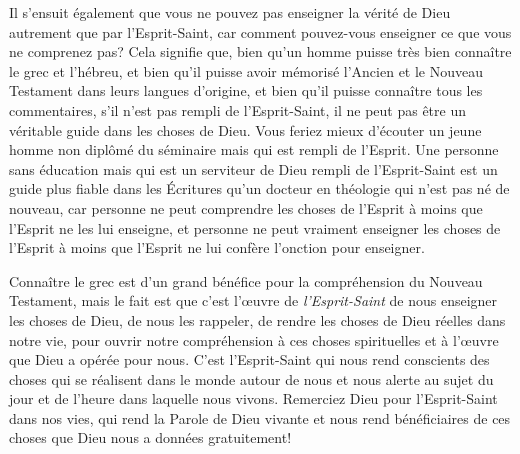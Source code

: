 Il s'ensuit également que vous ne pouvez pas enseigner
 la vérité de Dieu autrement que par l'Esprit-Saint,
 car comment pouvez-vous enseigner ce que vous ne comprenez pas?
 Cela signifie que, bien qu'un homme puisse très bien connaître le grec et l'hébreu,
 et bien qu'il puisse avoir mémorisé l'Ancien
 et le Nouveau Testament dans leurs langues d'origine,
 et bien qu'il puisse connaître tous les commentaires,
 s'il n'est pas rempli de l'Esprit-Saint,
 il ne peut pas être un véritable guide dans les choses de Dieu.
 Vous feriez mieux d'écouter un jeune homme non diplômé
 du séminaire mais qui est rempli de l'Esprit.
 Une personne sans éducation mais qui est un serviteur de Dieu
 rempli de l'Esprit-Saint est un guide plus fiable
 dans les Écritures qu'un docteur en théologie
 qui n'est pas né de nouveau,
 car personne ne peut comprendre les choses de l'Esprit
 à moins que l'Esprit ne les lui enseigne,
 et personne ne peut vraiment enseigner les choses de l'Esprit
 à moins que l'Esprit ne lui confère l'onction pour enseigner.

Connaître le grec est d'un grand bénéfice pour la compréhension
 du Nouveau Testament, mais le fait est que c'est l'œuvre
 de \emph{l'Esprit-Saint} de nous enseigner les choses de Dieu,
 de nous les rappeler, de rendre les choses de Dieu réelles
 dans notre vie, pour ouvrir notre compréhension
 à ces choses spirituelles et à l'œuvre que Dieu a opérée pour nous.
 C'est l'Esprit-Saint qui nous rend conscients des choses
 qui se réalisent dans le monde autour de nous et nous alerte
 au sujet du jour et de l'heure dans laquelle nous vivons.
 Remerciez Dieu pour l'Esprit-Saint dans nos vies,
 qui rend la Parole de Dieu vivante et nous rend bénéficiaires
 de ces choses que Dieu nous a données gratuitement!
\closechapter

